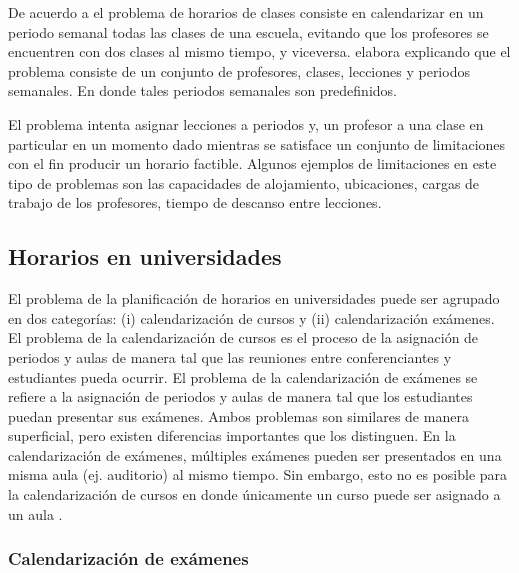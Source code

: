\documentclass[draft,12pt,headsepline,footsepline,paper=letter]{scrreprt}
\begin{document}
De acuerdo a \citet[p.~88]{schaerf99a-survey-of-automated} el problema de horarios de clases consiste en calendarizar en un periodo semanal todas las clases de una escuela, evitando que los profesores se encuentren con dos clases al mismo tiempo, y viceversa. \citet[p.~10,11]{abdullah06heuristic-approaches} elabora explicando que el problema consiste de un conjunto de profesores, clases, lecciones y periodos semanales. En donde tales periodos semanales son predefinidos.

El problema intenta asignar lecciones a periodos y, un profesor a una clase en particular en un momento dado mientras se satisface un conjunto de limitaciones con el fin producir un horario factible. Algunos ejemplos de limitaciones en este tipo de problemas son las capacidades de alojamiento, ubicaciones, cargas de trabajo de los profesores, tiempo de descanso entre lecciones.

\subsection{Horarios en universidades}

El problema de la planificación de horarios en universidades puede ser agrupado en dos categorías: (i) calendarización de cursos y (ii) calendarización exámenes. 
El problema de la calendarización de cursos es el proceso de la asignación de periodos y aulas de manera tal que las reuniones entre conferenciantes y estudiantes pueda ocurrir. 
El problema de la calendarización de exámenes se refiere a la asignación de periodos y aulas de manera tal que los estudiantes puedan presentar sus exámenes. 
Ambos problemas son similares de manera superficial, pero existen diferencias importantes que los distinguen. 
En la calendarización de exámenes, múltiples exámenes pueden ser presentados en una misma aula (ej. auditorio) al mismo tiempo. 
Sin embargo, esto no es posible para la calendarización de cursos en donde únicamente un curso puede ser asignado a un aula \citep[p.~11]{abdullah06heuristic-approaches}.

\subsubsection{Calendarización de exámenes}
\end{document}
